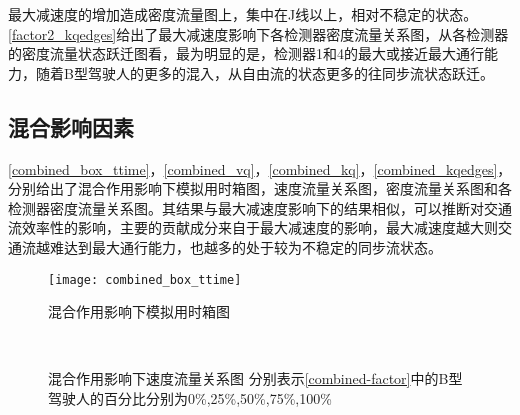 最大减速度的增加造成密度流量图上，集中在J线以上，相对不稳定的状态。\autoref{factor2_kqedges}给出了最大减速度影响下各检测器密度流量关系图，从各检测器的密度流量状态跃迁图看，最为明显的是，检测器1和4的最大或接近最大通行能力，随着B型驾驶人的更多的混入，从自由流的状态更多的往同步流状态跃迁。


\subsection{混合影响因素}

\autoref{combined_box_ttime}，\autoref{combined_vq}，\autoref{combined_kq}，\autoref{combined_kqedges}，分别给出了混合作用影响下模拟用时箱图，速度流量关系图，密度流量关系图和各检测器密度流量关系图。其结果与最大减速度影响下的结果相似，可以推断对交通流效率性的影响，主要的贡献成分来自于最大减速度的影响，最大减速度越大则交通流越难达到最大通行能力，也越多的处于较为不稳定的同步流状态。

\begin{figure}[H]
\begin{center}
\texttt{[image: combined\_box\_ttime]}
\caption{混合作用影响下模拟用时箱图}
\label{combined_box_ttime}
\end{center}
\end{figure}



\begin{figure}[H]%
\centering
{}%
\\%
%
\caption[A set of four sub-floats.]{混合作用影响下速度流量关系图
分别表示\autoref{combined-factor}中的B型驾驶人的百分比分别为0\%,25\%,50\%,75\%,100\%}%
\label{combined_vq}%
\end{figure}


